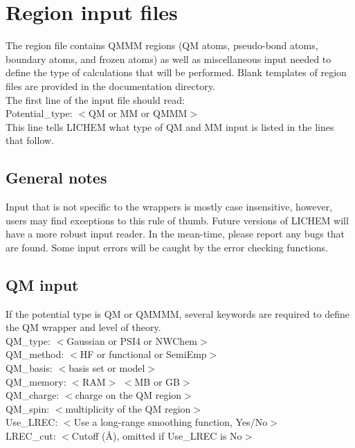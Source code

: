 \documentclass[12pt]{report}
\begin{document}
\section{Region input files}

The region file contains QMMM regions (QM atoms, pseudo-bond atoms, boundary
atoms, and frozen atoms) as well as miscellaneous input needed to define the
type of calculations that will be performed.
Blank templates of region files are provided in the documentation
directory. \\

The first line of the input file should read: \\

Potential\_type: $<$QM or MM or QMMM$>$ \\

This line tells LICHEM what type of QM and MM input is listed in the lines
that follow.

\subsection{General notes}

Input that is not specific to the wrappers is mostly case insensitive,
however, users may find exceptions to this rule of thumb.
Future versions of LICHEM will have a more robust input reader.
In the mean-time, please report any bugs that are found.
Some input errors will be caught by the error checking functions.

\subsection{QM input}

If the potential type is QM or QMMMM, several keywords are required to define
the QM wrapper and level of theory. \\

QM\_type: $<$Gaussian or PSI4 or NWChem$>$ \\
QM\_method: $<$HF or functional or SemiEmp$>$ \\
QM\_basis: $<$basis set or model$>$ \\
QM\_memory: $<$RAM$>$ $<$MB or GB$>$ \\
QM\_charge: $<$charge on the QM region$>$ \\
QM\_spin: $<$multiplicity of the QM region$>$ \\
Use\_LREC: $<$Use a long-range smoothing function, Yes/No$>$ \\
LREC\_cut: $<$Cutoff (\AA), omitted if Use\_LREC is No$>$ \\
\end{document}
